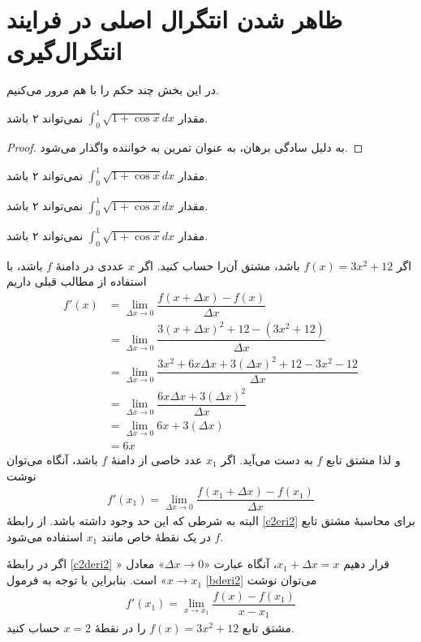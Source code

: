 \section{ظاهر شدن انتگرال اصلی در فرایند انتگرال‌گیری}
در این بخش چند حکم را با هم مرور می‌کنیم. 
\begin{lemma}
مقدار  $\int_0 ^1\sqrt{1+\cos x} dx $ نمی‌تواند ۲ باشد.
\end{lemma}
\begin{proof}
به دلیل سادگی برهان، به عنوان تمرین به خواننده واگذار می‌شود.
\end{proof}
\begin{proposition}
مقدار  $\int_0 ^1\sqrt{1+\cos x} dx $ نمی‌تواند ۲ باشد.
\end{proposition}
\begin{corollary}
مقدار  $\int_0 ^1\sqrt{1+\cos x} dx $ نمی‌تواند ۲ باشد.
\end{corollary}
\begin{remark}
مقدار  $\int_0 ^1\sqrt{1+\cos x} dx $ نمی‌تواند ۲ باشد.
\end{remark}





اگر  $f(x)=3x^2+12$ باشد، مشتق آن‌را حساب کنید.
اگر $x$ عددی در دامنهٔ $f$ باشد، با استفاده از مطالب قبلی داریم
\begin{align*}
f'(x)&=\lim_{\Delta x\rightarrow 0}\dfrac{f(x+\Delta x) - f(x)}{\Delta x}\\[2mm]
&=\lim_{\Delta x\rightarrow 0}\dfrac{3(x+\Delta x)^{2}+12 - (3x^2+12)}{\Delta x}\\[2mm]
&=\lim_{\Delta x\rightarrow 0}\dfrac{3x^2+6x\Delta x+3(\Delta x)^{2}+12-3x^2-12}{\Delta x}\\[2mm]
&=\lim_{\Delta x\rightarrow 0}\dfrac{6x\Delta x+3(\Delta x)^{2}}{\Delta x}\\[2mm]
&=\lim_{\Delta x\rightarrow 0}6x+3(\Delta x)\\[2mm]
&=6x
\end{align*}
و لذا مشتق تابع $f$ به دست می‌آید.
اگر $x_1$ عدد خاصی از دامنهٔ $f$ باشد، آنگاه می‌توان نوشت
\begin{align}\label{c2deri2}
f'(x_1)=\lim_{\Delta x\rightarrow 0}\dfrac{f(x_1+\Delta x) - f(x_1)}{\Delta x}
\end{align}
البته به شرطی که این حد وجود داشته باشد. از رابطهٔ \eqref{c2eri2} برای محاسبهٔ مشتق تابع $f$ در یک نقطهٔ 
خاص مانند $x_1$ استفاده می‌شود. 

اگر در رابطهٔ \eqref{c2deri2} قرار دهیم $x_1+\Delta x=x$، آنگاه عبارت
 «$\Delta x\rightarrow 0$» 
معادل «$x\rightarrow x_1$»
است. بنابراین با توجه به فرمول \eqref{bderi2} می‌توان نوشت
\begin{align}\label{c2deri3}
f'(x_1)=\lim_{ x\rightarrow x_1}\dfrac{f(x) - f(x_1)}{x-x_1}
\end{align}
مشتق تابع $f(x)=3x^2+12$ را در نقطهٔ $x=2$ حساب کنید.

